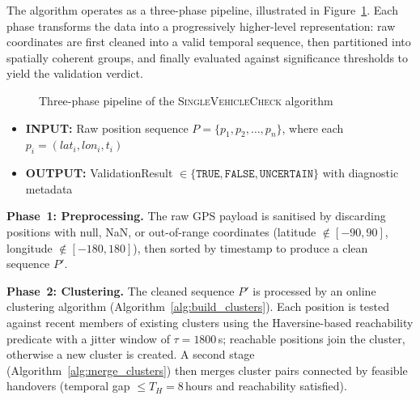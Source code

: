 The algorithm operates as a three-phase pipeline, illustrated in Figure~\ref{fig:algorithm_pipeline}. Each phase transforms the data into a progressively higher-level representation: raw coordinates are first cleaned into a valid temporal sequence, then partitioned into spatially coherent groups, and finally evaluated against significance thresholds to yield the validation verdict.

\begin{figure}[ht]
    \centering
    \caption{Three-phase pipeline of the \textsc{SingleVehicleCheck} algorithm}
    \label{fig:algorithm_pipeline}
\end{figure}


\begin{itemize}
    \item \textbf{INPUT:} Raw position sequence $P = \{p_1, p_2, \ldots, p_n\}$, where each $p_i = (\mathit{lat}_i, \mathit{lon}_i, t_i)$
    \item \textbf{OUTPUT:} ValidationResult $\in \{\mathtt{TRUE}, \mathtt{FALSE}, \mathtt{UNCERTAIN}\}$ with diagnostic metadata
\end{itemize}

\textbf{Phase~1: Preprocessing.} The raw GPS payload is sanitised by discarding positions with null, NaN, or out-of-range coordinates (latitude $\notin [-90, 90]$, longitude $\notin [-180, 180]$), then sorted by timestamp to produce a clean sequence $P'$.

\textbf{Phase~2: Clustering.} The cleaned sequence $P'$ is processed by an online clustering algorithm (Algorithm~\ref{alg:build_clusters}). Each position is tested against recent members of existing clusters using the Haversine-based reachability predicate with a jitter window of $\tau = 1800$\,s; reachable positions join the cluster, otherwise a new cluster is created. A second stage (Algorithm~\ref{alg:merge_clusters}) then merges cluster pairs connected by feasible handovers (temporal gap $\leq T_H = 8$\,hours and reachability satisfied).

